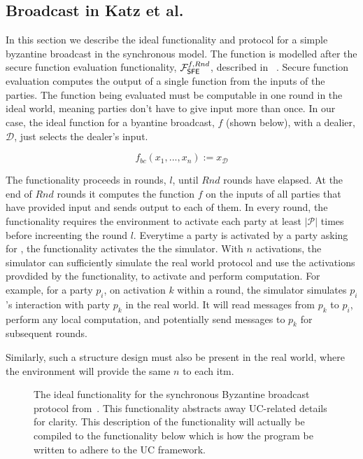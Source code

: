 \subsection{Broadcast in Katz et al.}

In this section we describe the ideal functionality and protocol for a simple byzantine broadcast in the synchronous model.
The function is modelled after the secure function evaluation functionality, $\mathcal{F}_{{\mathsf {SFE}}}^{f,Rnd}$, described in ~\cite{katz-clock}.
Secure function evaluation computes the output of a single function from the inputs of the parties.
The function being evaluated must be computable in one round in the ideal world, meaning parties don't have to give input more than once.
In our case, the ideal function for a byantine broadcast, $f$ (shown below), with a dealier, $\mathcal{D}$, just selects the dealer's input.

\[ f_{bc}(x_1,...,x_n) := x_{\mathcal{D}} \]

The functionality proceeds in rounds, $l$, until $Rnd$ rounds have elapsed.
At the end of $Rnd$ rounds it computes the function $f$ on the inputs of all parties that have provided input and sends output to each of them.
In every round, the functionality requires the environment to activate each party at least $|\mathcal{P}|$ times before increenting the round $l$. 
Everytime a party is activated by a party asking for , the functionality activates the the simulator.
With $n$ activations, the simulator can sufficiently simulate the real world protocol and use the activations provdided by the functionality, to activate and perform computation.
For example, for a party $p_i$, on activation $k$ within a round, the simulator simulates $p_i$'s interaction with party $p_k$ in the real world.
It will read messages from $p_k$ to $p_i$, perform any local computation, and potentially send messages to $p_k$ for subsequent rounds.

Similarly, such a structure design must also be present in the real world, where the environment will provide the same $n$  to each itm.

\begin{figure}[!h]
	
	\label{fig:functionality:broadcast_high}
	\caption{The ideal functionality for the synchronous Byzantine broadcast protocol from~\cite{bracha}. This functionality abstracts away UC-related details for clarity. This description of the functionality will actually be compiled to the functionality below which is how the program be written to adhere to the UC framework.}
\end{figure}

